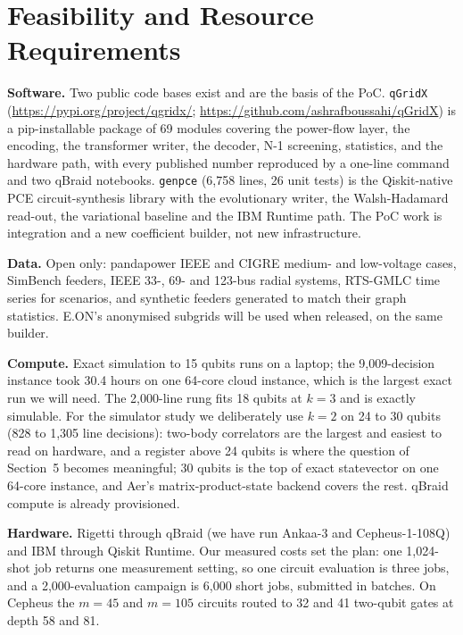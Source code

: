\documentclass[10pt,a4paper]{article}
\newcommand{\qgridxurl}{https://github.com/ashrafboussahi/qGridX}
\newcommand{\pypiurl}{https://pypi.org/project/qgridx/}
\begin{document}
\section{Feasibility and Resource Requirements}

\textbf{Software.} Two public code bases exist and are the basis of the PoC.
\texttt{qGridX} (\url{\pypiurl}; \url{\qgridxurl}) is a pip-installable
package of 69 modules covering the power-flow layer, the encoding, the
transformer writer, the decoder, N-1 screening, statistics, and the hardware
path, with every published number reproduced by a one-line command and two
qBraid notebooks. \texttt{genpce} (6,758 lines, 26 unit tests) is the
Qiskit-native PCE circuit-synthesis library with the evolutionary writer, the
Walsh-Hadamard read-out, the variational baseline and the IBM Runtime path.
The PoC work is integration and a new coefficient builder, not new
infrastructure.

\textbf{Data.} Open only: pandapower IEEE and CIGRE medium- and low-voltage
cases, SimBench feeders, IEEE 33-, 69- and 123-bus radial systems, RTS-GMLC
time series for scenarios, and synthetic feeders generated to match their
graph statistics. E.ON's anonymised subgrids will be used when released, on
the same builder.

\textbf{Compute.} Exact simulation to 15 qubits runs on a laptop; the
9,009-decision instance took 30.4 hours on one 64-core cloud instance, which
is the largest exact run we will need. The 2,000-line rung fits 18 qubits at
$k=3$ and is exactly simulable. For the simulator study we deliberately use
$k=2$ on 24 to 30 qubits (828 to 1,305 line decisions): two-body correlators
are the largest and easiest to read on hardware, and a register above 24
qubits is where the question of Section~5 becomes meaningful; 30 qubits is the
top of exact statevector on one 64-core instance, and Aer's
matrix-product-state backend covers the rest. qBraid compute is already
provisioned.

\textbf{Hardware.} Rigetti through qBraid (we have run Ankaa-3 and
Cepheus-1-108Q) and IBM through Qiskit Runtime. Our measured costs set the
plan: one 1,024-shot job returns one measurement setting, so one circuit
evaluation is three jobs, and a 2,000-evaluation campaign is 6,000 short
jobs, submitted in batches. On Cepheus the $m=45$ and $m=105$ circuits routed
to 32 and 41 two-qubit gates at depth 58 and 81.
\end{document}
